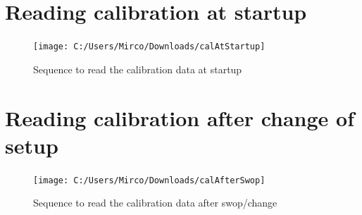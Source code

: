 \documentclass[12pt,a4paper]{article}
\begin{document}
	\section{Reading calibration at startup}
	\begin{figure}[H]
		\centering
		\texttt{[image: C:/Users/Mirco/Downloads/calAtStartup]}
		\caption{Sequence to read the calibration data at startup}
		\label{fig:calatstartup}
	\end{figure}
	\section{Reading calibration after change of setup}
	\begin{figure}[H]
		\centering
		\texttt{[image: C:/Users/Mirco/Downloads/calAfterSwop]}
		\caption{Sequence to read the calibration data after swop/change}
		\label{fig:calafterswop}
	\end{figure}

	
%	
%	
%	
\end{document}
